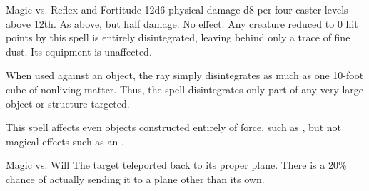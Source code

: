 \begin{spellheader}
    \spellrng{\rngclose}
\end{spellheader}
\begin{spelleffects}
    \begin{spellattack}{Magic vs. Reflex and Fortitude}
        \spellsuccess 12d6 physical damage \add d8 per four caster levels above 12th.
        \spellfailure[Fortitude] As above, but half damage.
        \spellfailure[Reflex] No effect.
        \spelleffect Any creature reduced to 0 hit points by this spell is entirely disintegrated, leaving behind only a trace of fine dust. Its equipment is unaffected.
        \par When used against an object, the ray simply disintegrates as much as one 10-foot cube of nonliving matter. Thus, the spell disintegrates only part of any very large object or structure targeted.
    \end{spellattack}
\end{spelleffects}
\begin{spellfooter}
    \spellnotes This spell affects even objects constructed entirely of force, such as , but not magical effects such as an .
\end{spellfooter}

\begin{spellheader}
    \spellrng{\rngclose}
\end{spellheader}
\begin{spelleffects}
    \begin{spellattack}{Magic vs. Will}
        \spellsuccess The target teleported back to its proper plane. There is a 20\% chance of actually sending it to a plane other than its own.
    \end{spellattack}
\end{spelleffects}
\begin{spellfooter}

\end{spellfooter}

